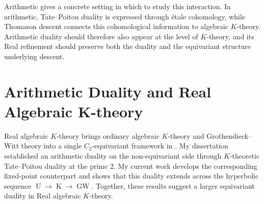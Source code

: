 \documentclass[11pt]{article}
\newcommand{\K}{\operatorname{K}}
\newcommand{\GW}{\operatorname{GW}}
\begin{document}
Arithmetic gives a concrete setting in which to study this interaction.
In arithmetic, Tate--Poitou duality is expressed through étale cohomology, while Thomason descent connects this cohomological information to algebraic $K$-theory.
Arithmetic duality should therefore also appear at the level of $K$-theory, and its Real refinement should preserve both the duality and the equivariant structure underlying descent.

\section{Arithmetic Duality and Real Algebraic K-theory}
Real algebraic $K$-theory brings ordinary algebraic $K$-theory and Grothendieck--Witt theory into a single $C_2$-equivariant framework in \cite{HMreal}.
My dissertation established an arithmetic duality on the non-equivariant side through $K$-theoretic Tate--Poitou duality at the prime $2$.
My current work develops the corresponding fixed-point counterpart and shows that this duality extends across the hyperbolic sequence $\operatorname{U}\to\K\to\GW$.
Together, these results suggest a larger equivariant duality in Real algebraic $K$-theory.
\end{document}
